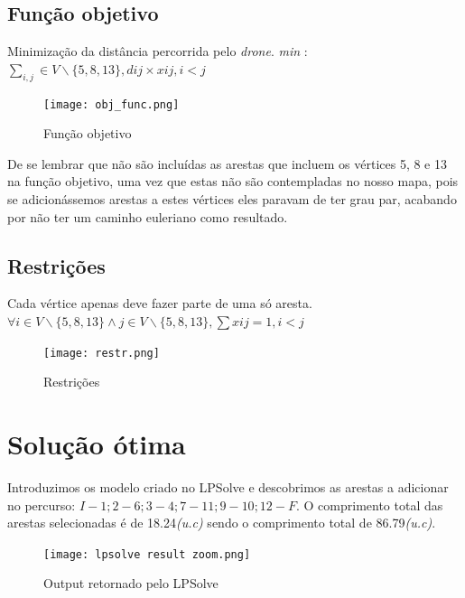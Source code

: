 \documentclass[runningheads]{llncs}
\begin{document}
    \subsection{Função objetivo}
    Minimização da distância percorrida pelo \textit{drone}.
    \newline \textit{min} : $\sum_{i,j}^{} \in V \backslash \{5,8,13\},  dij  \times    xij,  i < j$

    \begin{figure}[h]
        \centering
        \texttt{[image: obj\_func.png]}
        \caption{Função objetivo}
        \label{fig:data5}
    \end{figure}

    \bigskip
    De se lembrar que não são incluídas as arestas que incluem os vértices 5, 8 e 13 na função objetivo, uma vez que estas não são contempladas no nosso mapa, pois se adicionássemos arestas a estes vértices eles paravam de ter grau par, acabando por não ter um caminho euleriano como resultado.

    \newpage
    \subsection{Restrições}
    Cada vértice apenas deve fazer parte de uma só aresta.
    \newline $\forall i \in V \backslash \{5,8,13\} \wedge  j \in V \backslash \{5,8,13\},  \sum xij = 1, i < j$

    \begin{figure}[h]
        \centering
        \texttt{[image: restr.png]}
        \caption{Restrições}
        \label{fig:data6}
    \end{figure}


    \newpage

    \section{Solução ótima}
    Introduzimos os modelo criado no LPSolve e descobrimos as arestas a adicionar no
    percurso: $I-1; 2-6; 3-4; 7-11; 9-10; 12-F$. O comprimento total das arestas selecionadas é de 18.24\textit{(u.c)} sendo o comprimento total de 86.79\textit{(u.c)}.

    \begin{figure}[ht]
        \centering
        \texttt{[image: lpsolve result zoom.png]}
        \caption{Output retornado pelo LPSolve}
        \label{fig:data7}
    \end{figure}
\end{document}
